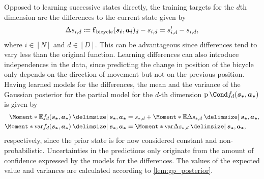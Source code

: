 Opposed to learning successive states directly, the training targets for the $d$th dimension are the differences to the current state given by
\begin{align}
    \Delta s_{i,d} \coloneqq \operatorname{\operatorname{\mathbf{f}}_{\text{bicycle}}}(\bm{s_i}, \bm{a_i})_d - s_{i,d} = s_{i,d }^\prime - s_{i,d},
\end{align}
where $i \in [N]$ and $d \in [D]$.
This can be advantageous since differences tend to vary less than the original function.
Learning differences can also introduce independences in the data, since predicting the change in position of the bicycle only depends on the direction of movement but not on the previous position.
Having learned models for the differences, the mean and the variance of the Gaussian posterior for the partial model for the $d$-th dimension $\Prob{f_d(\mat{s_\ast}, \mat{a_\ast})}$ is given by
\begin{align}
    \Moment*{\E}{f_d(\mat{s_\ast}, \mat{a_\ast}) \given \mat{s_\ast}, \mat{a_\ast}} &= s_{\ast,d} + \Moment*{\E}{\Delta s_{\ast,d} \given \mat{s_\ast}, \mat{a_\ast}}, \\
    \Moment*{\var}{f_d(\mat{s_\ast}, \mat{a_\ast}) \given \mat{s_\ast}, \mat{a_\ast}} &= \Moment*{\var}{\Delta s_{\ast,d} \given \mat{s_\ast}, \mat{a_\ast}},
\end{align}
respectively, since the prior state is for now considered constant and non-probabilistic.
Uncertainties in the predictions only originate from the amount of confidence expressed by the models for the differences.
The values of the expected value and variances are calculated according to \cref{lem:gp_posterior}.

